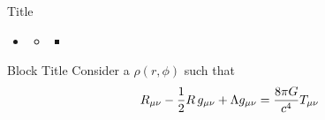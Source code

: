 \documentclass[10pt, aspectratio=169]{beamer}
\begin{document}
\begin{frame}{Title}
    \begin{itemize}
    \item \lipsum[1][5]
        \begin{itemize}
        \item \lipsum[1][5]
            \begin{itemize}
            \item \lipsum[1][5]
            \end{itemize}
        \end{itemize}
    \end{itemize}

    \begin{block}{Block Title}
        Consider a  $\rho(r,\phi)$ such that
        \begin{equation*}
            R_{\mu \nu} - {1 \over 2}R \, g_{\mu \nu} + \Lambda g_{\mu \nu}= {8 \pi G \over c^4} T_{\mu \nu}
        \end{equation*}
    \end{block}
\end{frame}

\end{document}
